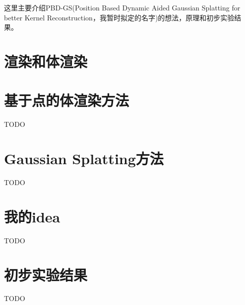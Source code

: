 这里主要介绍PBD-GS(Position Based Dynamic Aided Gaussian Splatting for better Kernel Reconstruction，我暂时拟定的名字)的想法，原理和初步实验结果。

\section{渲染和体渲染}



\section{基于点的体渲染方法}
TODO
\section{Gaussian Splatting方法}
TODO
\section{我的idea}
TODO
\section{初步实验结果}
TODO 
